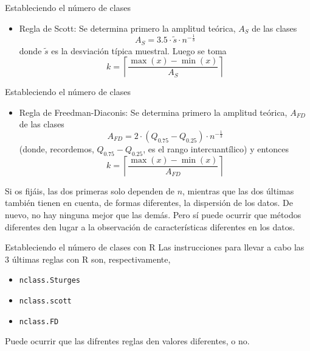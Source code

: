 \documentclass[
  ignorenonframetext,
]{beamer}
\providecommand{\tightlist}{%
  \setlength{\itemsep}{0pt}\setlength{\parskip}{0pt}}
\begin{document}
\begin{frame}{Estableciendo el número de clases}
\protect\hypertarget{estableciendo-el-nuxfamero-de-clases-1}{}
\begin{itemize}
\tightlist
\item
  Regla de Scott: Se determina primero la amplitud teórica, \(A_S\) de
  las clases \[A_S = 3.5\cdot\tilde{s}\cdot n^{-\frac{1}{3}}\] donde
  \(\tilde{s}\) es la desviación típica muestral. Luego se toma
  \[k = \left\lceil \frac{\max(x)-\min(x)}{A_S}\right\rceil\]
\end{itemize}
\end{frame}

\begin{frame}{Estableciendo el número de clases}
\protect\hypertarget{estableciendo-el-nuxfamero-de-clases-2}{}
\begin{itemize}
\tightlist
\item
  Regla de Freedman-Diaconis: Se determina primero la amplitud teórica,
  \(A_{FD}\) de las clases
  \[A_{FD} = 2\cdot(Q_{0.75}-Q_{0.25})\cdot n^{-\frac{1}{3}}\] (donde,
  recordemos, \(Q_{0.75}-Q_{0.25}\), es el rango intercuantílico) y
  entonces
  \[k = \left\lceil \frac{\max(x)-\min(x)}{A_{FD}}\right\rceil\]
\end{itemize}

Si os fijáis, las dos primeras solo dependen de \(n\), mientras que las
dos últimas también tienen en cuenta, de formas diferentes, la
dispersión de los datos. De nuevo, no hay ninguna mejor que las demás.
Pero sí puede ocurrir que métodos diferentes den lugar a la observación
de características diferentes en los datos.
\end{frame}

\begin{frame}[fragile]{Estableciendo el número de clases con R}
\protect\hypertarget{estableciendo-el-nuxfamero-de-clases-con-r}{}
Las instrucciones para llevar a cabo las 3 últimas reglas con R son,
respectivamente,

\begin{itemize}
\tightlist
\item
  \texttt{nclass.Sturges}
\item
  \texttt{nclass.scott}
\item
  \texttt{nclass.FD}
\end{itemize}

Puede ocurrir que las difrentes reglas den valores diferentes, o no.
\end{frame}
\end{document}
